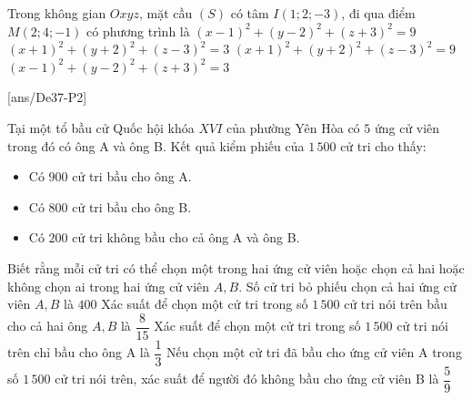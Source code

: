 \begin{ex}%
	Trong không gian $Oxyz$, mặt cầu $(S)$ có tâm $I(1;2;-3)$, đi qua điểm $M(2;4;-1)$ có phương trình là
	\choice
	{\True $(x-1)^2+(y-2)^2+(z+3)^2=9$}
	{$(x+1)^2+(y+2)^2+(z-3)^2=3$}
	{$(x+1)^2+(y+2)^2+(z-3)^2=9$}
	{$(x-1)^2+(y-2)^2+(z+3)^2=3$}
\end{ex}
\cauds
{}[ans/De37-P2]
\begin{ex}%
	Tại một tổ bầu cử Quốc hội khóa $XVI$ của phường Yên Hòa có $5$ ứng cử viên trong đó có ông A và ông B. Kết quả kiểm phiếu của $1\,500$ cử tri cho thấy:
	\begin{itemize}
		\item Có $900$ cử tri bầu cho ông A.
		\item Có $800$ cử tri bầu cho ông B.
		\item Có $200$ cử tri không bầu cho cả ông A và ông B.
	\end{itemize}
	Biết rằng mỗi cử tri có thể chọn một trong hai ứng cử viên hoặc chọn cả hai hoặc không chọn ai trong hai ứng cử viên $A, B$.
	\choiceTF
	{\True Số cử tri bỏ phiếu chọn cả hai ứng cử viên $A, B$ là $400$}
	{Xác suất để chọn một cử tri trong số $1\,500$ cử tri nói trên bầu cho cả hai ông $A, B$ là $\dfrac{8}{15}$}
	{\True Xác suất để chọn một cử tri trong số $1\,500$ cử tri nói trên chỉ bầu cho ông A là $\dfrac{1}{3}$}
	{\True Nếu chọn một cử tri đã bầu cho ứng cử viên A trong số $1\,500$ cử tri nói trên, xác suất để người đó không bầu cho ứng cử viên B là $\dfrac{5}{9}$}
\end{ex}

